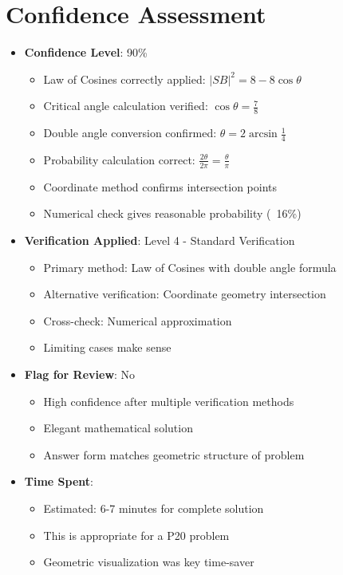 \documentclass[12pt]{article}
\begin{document}
\section*{Confidence Assessment}
\begin{itemize}[leftmargin=*]
    \item \textbf{Confidence Level}: 90\% 
    \begin{itemize}
        \item Law of Cosines correctly applied: $|SB|^2 = 8 - 8\cos\theta$
        \item Critical angle calculation verified: $\cos\theta = \frac{7}{8}$
        \item Double angle conversion confirmed: $\theta = 2\arcsin\frac{1}{4}$
        \item Probability calculation correct: $\frac{2\theta}{2\pi} = \frac{\theta}{\pi}$
        \item Coordinate method confirms intersection points
        \item Numerical check gives reasonable probability (~16\%)
    \end{itemize}
    \item \textbf{Verification Applied}: Level 4 - Standard Verification
    \begin{itemize}
        \item Primary method: Law of Cosines with double angle formula
        \item Alternative verification: Coordinate geometry intersection
        \item Cross-check: Numerical approximation
        \item Limiting cases make sense
    \end{itemize}
    \item \textbf{Flag for Review}: No
    \begin{itemize}
        \item High confidence after multiple verification methods
        \item Elegant mathematical solution
        \item Answer form matches geometric structure of problem
    \end{itemize}
    \item \textbf{Time Spent}: 
    \begin{itemize}
        \item Estimated: 6-7 minutes for complete solution
        \item This is appropriate for a P20 problem
        \item Geometric visualization was key time-saver
    \end{itemize}
\end{itemize}
\end{document}
